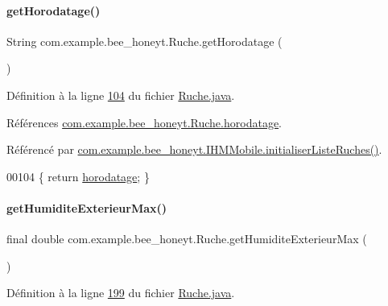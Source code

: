 \paragraph{\texorpdfstring{get\+Horodatage()}{getHorodatage()}}
{\footnotesize\ttfamily String com.\+example.\+bee\+\_\+honeyt.\+Ruche.\+get\+Horodatage (\begin{DoxyParamCaption}{ }\end{DoxyParamCaption})}



Définition à la ligne \hyperlink{_ruche_8java_source_l00104}{104} du fichier \hyperlink{_ruche_8java_source}{Ruche.\+java}.



Références \hyperlink{_ruche_8java_source_l00020}{com.\+example.\+bee\+\_\+honeyt.\+Ruche.\+horodatage}.



Référencé par \hyperlink{_i_h_m_mobile_8java_source_l00170}{com.\+example.\+bee\+\_\+honeyt.\+I\+H\+M\+Mobile.\+initialiser\+Liste\+Ruches()}.


\begin{DoxyCode}
00104 \{ \textcolor{keywordflow}{return} \hyperlink{classcom_1_1example_1_1bee__honeyt_1_1_ruche_a93b3665d844cbba761ebf9a19a1d7d34}{horodatage}; \}
\end{DoxyCode}
\mbox{\label{classcom_1_1example_1_1bee__honeyt_1_1_ruche_ae489d121777412762533465498d1e60c}} 
\paragraph{\texorpdfstring{get\+Humidite\+Exterieur\+Max()}{getHumiditeExterieurMax()}}
{\footnotesize\ttfamily final double com.\+example.\+bee\+\_\+honeyt.\+Ruche.\+get\+Humidite\+Exterieur\+Max (\begin{DoxyParamCaption}{ }\end{DoxyParamCaption})}



Définition à la ligne \hyperlink{_ruche_8java_source_l00199}{199} du fichier \hyperlink{_ruche_8java_source}{Ruche.\+java}.



